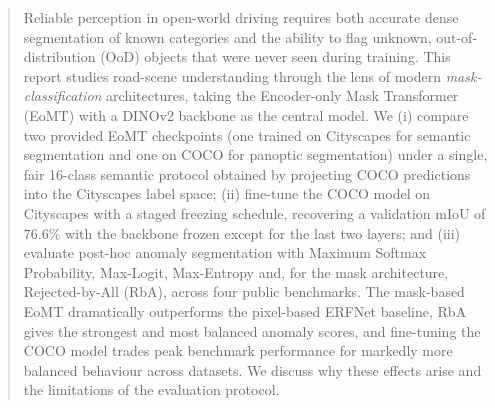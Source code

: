 \begin{abstract}
Reliable perception in open-world driving requires both accurate dense
segmentation of known categories and the ability to flag unknown,
out-of-distribution (OoD) objects that were never seen during training.
This report studies road-scene understanding through the lens of modern
\emph{mask-classification} architectures, taking the Encoder-only Mask
Transformer (EoMT) with a DINOv2 backbone as the central model. We (i)
compare two provided EoMT checkpoints (one trained on Cityscapes for
semantic segmentation and one on COCO for panoptic segmentation) under a
single, fair 16-class semantic protocol obtained by projecting COCO
predictions into the Cityscapes label space; (ii) fine-tune the COCO model
on Cityscapes with a staged freezing schedule, recovering a validation mIoU
of $76.6\%$ with the backbone frozen except for the last two layers; and (iii) evaluate post-hoc anomaly
segmentation with Maximum Softmax Probability, Max-Logit, Max-Entropy and,
for the mask architecture, Rejected-by-All (RbA), across four public
benchmarks. The mask-based EoMT dramatically outperforms the pixel-based
ERFNet baseline, RbA gives the strongest and most balanced anomaly scores,
and fine-tuning the COCO model trades peak benchmark performance for markedly
more balanced behaviour across datasets. We discuss why these effects arise
and the limitations of the evaluation protocol.
\end{abstract}
